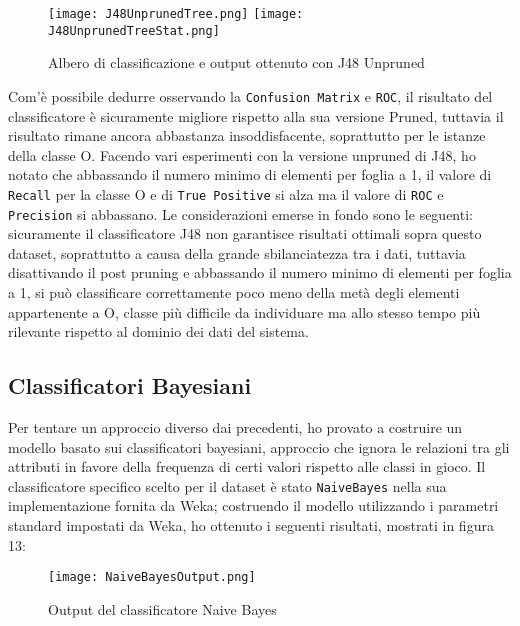 \begin{figure}[H]
	\texttt{[image: J48UnprunedTree.png]}
	\texttt{[image: J48UnprunedTreeStat.png]}
	\caption{Albero di classificazione e output ottenuto con J48 Unpruned}
\end{figure}
Com'è possibile dedurre osservando la \texttt{Confusion Matrix} e \texttt{ROC}, il risultato del classificatore è sicuramente migliore rispetto alla sua versione Pruned, tuttavia il risultato rimane ancora abbastanza insoddisfacente, soprattutto per le istanze della classe O.
Facendo vari esperimenti con la versione unpruned di J48, ho notato che abbassando il numero minimo di elementi per foglia a 1, il valore di \texttt{Recall} per la classe O e di \texttt{True Positive} si alza ma il valore di \texttt{ROC} e \texttt{Precision} si abbassano.
Le considerazioni emerse in fondo sono le seguenti: sicuramente il classificatore J48 non garantisce risultati ottimali sopra questo dataset, soprattutto a causa della grande sbilanciatezza tra i dati, tuttavia disattivando il post pruning e abbassando il numero minimo di elementi per foglia a 1, si può classificare correttamente poco meno della metà degli elementi appartenente a O, classe più difficile da individuare ma allo stesso tempo più rilevante rispetto al dominio dei dati del sistema.
  
  \subsection{Classificatori Bayesiani}
  Per tentare un approccio diverso dai precedenti, ho provato a costruire un modello basato sui classificatori bayesiani, approccio che ignora le relazioni tra gli attributi in favore della frequenza di certi valori rispetto alle classi in gioco.
  Il classificatore specifico scelto per il dataset è stato \texttt{NaiveBayes} nella sua implementazione fornita da Weka; costruendo il modello utilizzando i parametri standard impostati da Weka, ho ottenuto i seguenti risultati, mostrati in figura 13:
  
  \begin{figure}[H]
  	\texttt{[image: NaiveBayesOutput.png]}
  	\caption{Output del classificatore Naive Bayes}
  \end{figure}


